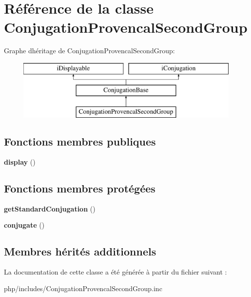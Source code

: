 \hypertarget{classConjugationProvencalSecondGroup}{}\section{Référence de la classe Conjugation\+Provencal\+Second\+Group}
\label{classConjugationProvencalSecondGroup}
Graphe d\textquotesingle{}héritage de Conjugation\+Provencal\+Second\+Group\+:\begin{figure}[H]
\begin{center}
\leavevmode
\includegraphics[height=3.000000cm]{classConjugationProvencalSecondGroup}
\end{center}
\end{figure}
\subsection*{Fonctions membres publiques}
\begin{DoxyCompactItemize}
\item 
\hypertarget{classConjugationProvencalSecondGroup_a99d29b0ed4e0e8129dfff0ed94746c4f}{}\label{classConjugationProvencalSecondGroup_a99d29b0ed4e0e8129dfff0ed94746c4f} 
{\bfseries display} ()
\end{DoxyCompactItemize}
\subsection*{Fonctions membres protégées}
\begin{DoxyCompactItemize}
\item 
\hypertarget{classConjugationProvencalSecondGroup_abe567700b32c8867ff9a5cd4d9777aec}{}\label{classConjugationProvencalSecondGroup_abe567700b32c8867ff9a5cd4d9777aec} 
{\bfseries get\+Standard\+Conjugation} ()
\item 
\hypertarget{classConjugationProvencalSecondGroup_a8e2552ef5ad24b15da6b0b294acf4ae1}{}\label{classConjugationProvencalSecondGroup_a8e2552ef5ad24b15da6b0b294acf4ae1} 
{\bfseries conjugate} ()
\end{DoxyCompactItemize}
\subsection*{Membres hérités additionnels}


La documentation de cette classe a été générée à partir du fichier suivant \+:\begin{DoxyCompactItemize}
\item 
php/includes/Conjugation\+Provencal\+Second\+Group.\+inc\end{DoxyCompactItemize}
